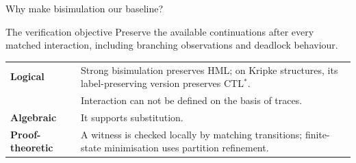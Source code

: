 \documentclass[handout,aspectratio=169,11pt]{beamer}
\begin{document}
\begin{frame}{Why make bisimulation our baseline?}
  \begin{block}{The verification objective}
    Preserve the available continuations after every matched interaction,
    including branching observations and deadlock behaviour.
  \end{block}
  \renewcommand{\arraystretch}{1.45}
  \begin{tabular}{@{}p{}p{}@{}}
    \textbf{Logical} & Strong bisimulation preserves HML; on Kripke structures, its label-preserving version preserves CTL$^*$. \\
    & Interaction can not be defined on the basis of traces.\\
    \textbf{Algebraic} & It supports substitution.\\
    \textbf{Proof-theoretic} & A witness is checked locally by matching transitions; finite-state minimisation uses partition refinement.
  \end{tabular}
  \vspace{2mm}
\end{frame}

\end{document}
